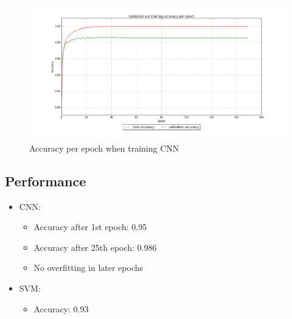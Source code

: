\documentclass[paper=a4, fontsize=11pt]{scrartcl} %
\begin{document}
    \begin{figure}[H]
        \begin{center}
            \includegraphics[width=1.0\linewidth]{images/mnist_training_log.png}
            \caption{Accuracy per epoch when training CNN}
            \label{fig:train}
        \end{center}
    \end{figure}
    
    \subsection*{Performance}
    	\begin{itemize}
    		\item CNN: 
    		\begin{itemize}
    			\item Accuracy after 1st epoch: 0.95
    			\item Accuracy after 25th epoch: 0.986
    			\item No overfitting in later epochs
    		\end{itemize}
    		\item SVM: 
    		\begin{itemize}
    			\item Accuracy: 0.93
    		\end{itemize}
   		\end{itemize}
   		
\end{document}

